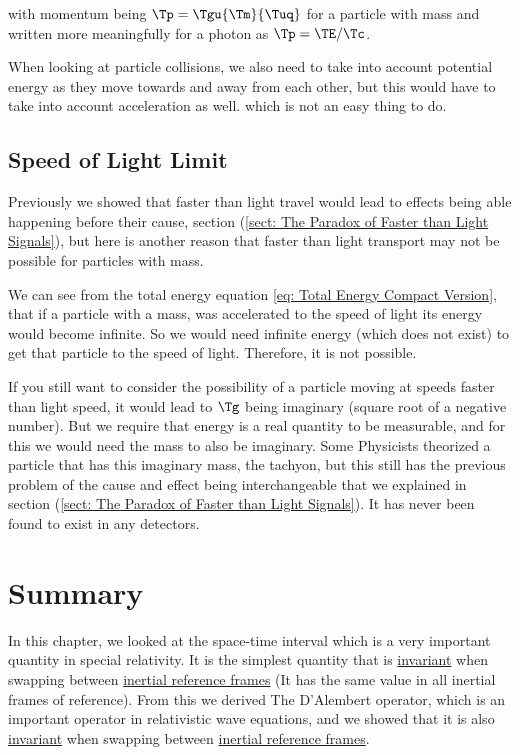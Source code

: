 with momentum being $\Tp  = \Tgu  {\Tm }{\Tuq }$ for a particle with mass and written more meaningfully for a photon as $\Tp =\TE /\Tc $.

\sidenote

When looking at particle collisions, we also need to take into account potential energy as they move towards and away from each other, but this would have to take into account acceleration as well. which is not an easy thing to do.

\subsection{Speed of Light Limit}\label{subsect: Speed of Light Limit}

Previously we showed that faster than light travel would lead to effects being able happening before their cause, section (\ref{sect: The Paradox of Faster than Light Signals}), but here is another reason that faster than light transport may not be possible for particles with mass.

We can see from the total energy equation \eqref{eq: Total Energy Compact Version}, that if a particle with a mass, was accelerated to the speed of light its energy would become infinite.
So we would need infinite energy (which does not exist) to get that particle to the speed of light.
Therefore, it is not possible.

If you still want to consider the possibility of a particle moving at speeds faster than light speed, it would lead to $\Tg $ being imaginary (square root of a negative number).
But we require that energy is a real quantity to be measurable, and for this we would need the mass to also be imaginary.
Some Physicists theorized a particle that has this imaginary mass, the tachyon, but this still has the previous problem of the cause and effect being interchangeable that we explained in section (\ref{sect: The Paradox of Faster than Light Signals}).
It has never been found to exist in any detectors.

\section{Summary}\label{sect: Summary chapter 3}

In this chapter, we looked at the space-time interval which is a very important quantity in special relativity.
It is the simplest quantity that is \hyperlink{def-lorentz-invariant}{invariant} when swapping between \hyperlink{def-Inertial-reference-frame}{inertial reference frames} (It has the same value in all inertial frames of reference).
From this we derived The D'Alembert operator, which is an important operator in relativistic wave equations, and we showed that it is also \hyperlink{def-lorentz-invariant}{invariant} when swapping between \hyperlink{def-Inertial-reference-frame}{inertial reference frames}.

